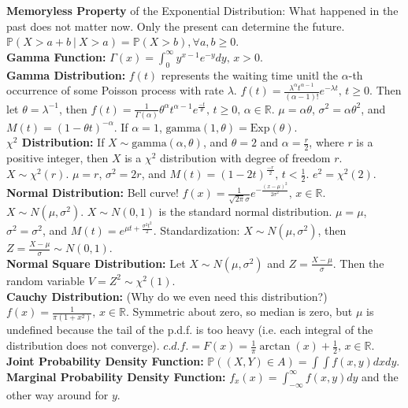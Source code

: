 \documentclass[10pt, twocolumn]{article}
\newcommand\given[1][]{\:#1\vert\:}
\begin{document}
\textbf{Memoryless Property} of the Exponential Distribution: What happened in the past does not matter now. Only the present can determine the future. $\mathbb{P}(X > a+b \given[\big] X > a) = \mathbb{P}(X > b), \forall a, b \geq 0$.\\
\textbf{Gamma Function:} $\Gamma(x) = \int_{0}^{\infty} y^{x-1} e^{-y} dy, \, x > 0$.\\
\textbf{Gamma Distribution:} $f(t)$ represents the waiting time unitl the $\alpha$-th occurrence of some Poisson process with rate $\lambda$. $f(t) = \frac{\lambda^\alpha t^{\alpha-1}}{(\alpha-1)!} e^{-\lambda t}, \, t \geq 0$. Then let $\theta = \lambda^{-1}$, then $f(t) = \frac{1}{\Gamma(\alpha)} \theta^{\alpha} t^{\alpha - 1} e^{\frac{-t}{\theta}}, \, t \geq 0, \, \alpha \in \mathbb{R}$. $\mu = \alpha \theta$, $\sigma^2 = \alpha \theta^2$, and $M(t) = (1 - \theta t)^{-\alpha}$. If $\alpha = 1$, $\mathrm{gamma}(1,\theta) = \mathrm{Exp}(\theta)$.\\
\textbf{$\chi^2$ Distribution:} If $X \sim \mathrm{gamma}(\alpha,\theta)$, and $\theta = 2$ and $\alpha = \frac{r}{2}$, where $r$ is a positive integer, then $X$ is a $\chi^2$ distribution with degree of freedom $r$. $X \sim \chi^2(r)$. $\mu = r$, $\sigma^2 = 2r$, and $M(t) = (1-2t)^{\frac{-r}{2}}, \, t < \frac{1}{2}$. $e^2 = \chi^2(2)$.\\
\textbf{Normal Distribution:} Bell curve! $f(x) = \frac{1}{\sqrt{2\pi}\sigma} e^{-\frac{(x-\mu)^2}{2\sigma^2}}, \, x \in \mathbb{R}$. $X \sim N(\mu, \sigma^2)$. $X \sim N(0, 1)$ is the standard normal distribution. $\mu = \mu$, $\sigma^2 = \sigma^2$, and $M(t) = e^{\mu t + \frac{\sigma^2 t^2}{2}}$. Standardization: $X \sim N(\mu, \sigma^2)$, then $Z = \frac{X-\mu}{\sigma} \sim N(0, 1)$.\\
\textbf{Normal Square Distribution:} Let $X \sim N(\mu, \sigma^2)$ and $Z = \frac{X-\mu}{\sigma}$. Then the random variable $V = Z^2 \sim \chi^2(1)$.\\
\textbf{Cauchy Distribution:} (Why do we even need this distribution?) $f(x) = \frac{1}{\pi (1 + x^2)}, \, x \in \mathbb{R}$. Symmetric about zero, so median is zero, but $\mu$ is undefined because the tail of the p.d.f. is too heavy (i.e. each integral of the distribution does not converge). $c.d.f. = F(x) = \frac{1}{\pi} \arctan(x) + \frac{1}{2}, \, x \in \mathbb{R}$.\\
\textbf{Joint Probability Density Function:} $\mathbb{P}((X, Y) \in A) = \int\int f(x,y) dx dy$.\\
\textbf{Marginal Probability Density Function:} $f_x(x) = \int_{-\infty}^{\infty} f(x,y) dy$ and the other way around for $y$.\\
\end{document}
